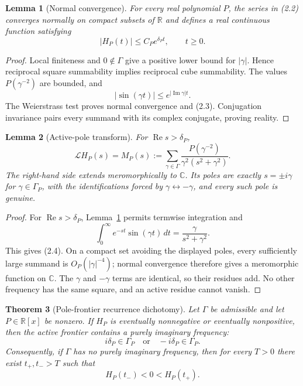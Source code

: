 \documentclass[11pt]{article}
\newtheorem{theorem}{Theorem}[section]
\newtheorem{lemma}[theorem]{Lemma}
\theoremstyle{remark}
\newcommand{\C}{\mathbb C}
\newcommand{\R}{\mathbb R}
\begin{document}
\begin{lemma}[Normal convergence]
\label{lem:normal}
For every real polynomial $P$, the series in \emph{(2.2)} converges normally on compact subsets of
$\R$ and defines a real continuous function satisfying
\[
 |H_P(t)|\leq C_P e^{\delta_P t},\qquad t\geq0.
 \tag{2.3}
\]
\end{lemma}

\begin{proof}
Local finiteness and $0\notin\Gamma$ give a positive lower bound for $|\gamma|$.  Hence reciprocal
square summability implies reciprocal cube summability.  The values $P(\gamma^{-2})$ are bounded,
and
\[
  |\sin(\gamma t)|\leq e^{|\operatorname{Im}\gamma|t}.
\]
The Weierstrass test proves normal convergence and (2.3).  Conjugation invariance pairs every
summand with its complex conjugate, proving reality.
\end{proof}

\begin{lemma}[Active-pole transform]
\label{lem:transform}
For $\operatorname{Re}s>\delta_P$,
\[
 \mathcal L H_P(s)
 =M_P(s):=
 \sum_{\gamma\in\Gamma}
 \frac{P(\gamma^{-2})}{\gamma^2(s^2+\gamma^2)}.
 \tag{2.4}
\]
The right-hand side extends meromorphically to $\C$.  Its poles are exactly
$s=\pm i\gamma$ for $\gamma\in\Gamma_P$, with the identifications forced by
$\gamma\leftrightarrow-\gamma$, and every such pole is genuine.
\end{lemma}

\begin{proof}
For $\operatorname{Re}s>\delta_P$, Lemma~\ref{lem:normal} permits termwise integration and
\[
 \int_0^\infty e^{-st}\sin(\gamma t)\,dt
 =\frac{\gamma}{s^2+\gamma^2}.
\]
This gives (2.4).  On a compact set avoiding the displayed poles, every sufficiently large
summand is $O_P(|\gamma|^{-4})$; normal convergence therefore gives a meromorphic function on
$\C$.  The $\gamma$ and $-\gamma$ terms are identical, so their residues add.  No other frequency
has the same square, and an active residue cannot vanish.
\end{proof}

\begin{theorem}[Pole-frontier recurrence dichotomy]
\label{thm:frontier}
Let $\Gamma$ be admissible and let $P\in\R[x]$ be nonzero.  If $H_P$ is eventually nonnegative or
eventually nonpositive, then the active frontier contains a purely imaginary frequency:
\[
  i\delta_P\in\Gamma_P
  \quad\text{or}\quad
  -i\delta_P\in\Gamma_P.
  \tag{2.5}
\]
Consequently, if $\Gamma$ has no purely imaginary frequency, then for every $T>0$ there exist
$t_+,t_->T$ such that
\[
 H_P(t_-)<0<H_P(t_+).
 \tag{2.6}
\]
\end{theorem}
\end{document}
